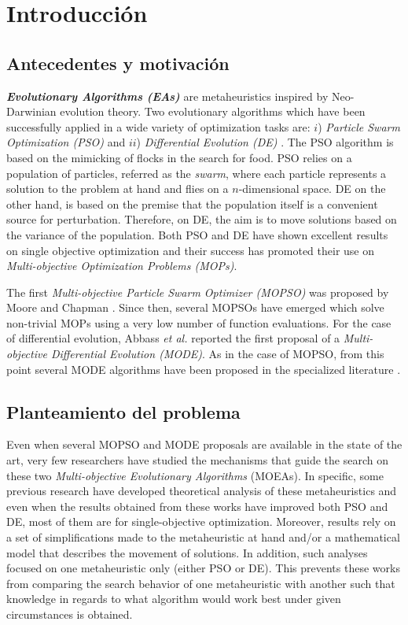 \chapter{Introducción}

\section{Antecedentes y motivación} 
\textbf{\emph{Evolutionary Algorithms (EAs)}} are metaheuristics inspired by Neo-Darwinian evolution theory. Two evolutionary algorithms which have been successfully applied in a wide variety of optimization tasks are: $i$) \emph{Particle Swarm Optimization (PSO)} \cite{Kennedy1995} and $ii$) \emph{Differential Evolution (DE)} \cite{Price1997}. The PSO algorithm is based on the mimicking of flocks in the search for food. PSO relies on a population of particles, referred as the \emph{swarm}, where each particle represents a solution to the problem at hand and flies on a $n$-dimensional space. DE on the other hand, is based on the premise that the population itself is a convenient source for perturbation. Therefore, on DE, the aim is to move solutions based on the variance of the population.  Both PSO and DE have shown excellent results on single objective optimization and their success has promoted their use on \emph{Multi-objective Optimization Problems (MOPs)}.

The first \emph{Multi-objective Particle Swarm Optimizer (MOPSO)} was proposed by Moore and Chapman \cite{Moore99}. Since then, several MOPSOs \cite{Reyes06,Toscano05,Branke06,Coello04} have emerged which solve non-trivial MOPs using a very low number of function evaluations. For the case of differential evolution, Abbass \emph{et al.} \cite{Abbass01} reported the first proposal of a \emph{Multi-objective Differential Evolution (MODE)}. As in the case of MOPSO, from this point several MODE algorithms have been proposed in the specialized literature \cite{Robic05,Santana05,Xue03}.



\section{Planteamiento del problema} 

Even when several MOPSO and MODE proposals are available in the state of the art, very few researchers have studied the mechanisms that guide the search on these two \emph{Multi-objective Evolutionary Algorithms} (MOEAs). In specific, some previous research have developed theoretical analysis of these metaheuristics \cite{Vandenbergh2006,Clerc2002} and even when the results obtained from these works have improved both PSO and DE, most of them are for single-objective optimization. Moreover, results rely on a set of simplifications made to the metaheuristic at hand and/or a mathematical model that describes the movement of solutions. In addition, such analyses focused on one metaheuristic only (either PSO or DE). This prevents these works from comparing the search behavior of one metaheuristic with another such that knowledge in regards to what algorithm would work best under given circumstances is obtained. 

